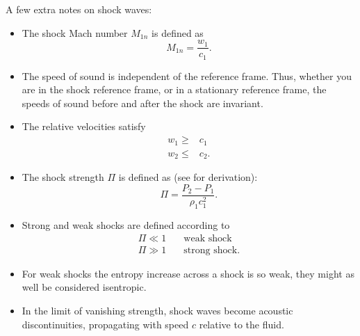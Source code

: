 \documentclass[oneside,a4paper,11pt]{report}
\begin{document}
A few extra notes on shock waves:
\begin{itemize}
    \item The shock Mach number $M_{1n}$ is defined as
    \begin{equation}
        M_{1n} = \frac{w_1}{c_1}.
    \end{equation}
    
    \item The speed of sound is independent of the reference frame. Thus, whether you are in the shock reference frame, or in a stationary reference frame, the speeds of sound before and after the shock are invariant.
    
    \item The relative velocities satisfy
    \begin{align}
        w_1 \ge &c_1 \nonumber \\
        w_2 \le &c_2.
    \end{align}
    
    \item The shock strength $\Pi$ is defined as (see \cite{thompson1988} for derivation):
    \begin{equation}
    \label{eq:shock_strength}
        \Pi = \frac{P_2 - P_1}{\rho_1 c_1^2}.
    \end{equation}
    
    \item Strong and weak shocks are defined according to
    \begin{align}
    \label{eq:strong_weak_shocks}
        \Pi \ll 1 \quad & \text{weak shock} \nonumber \\
        \Pi \gg 1 \quad & \text{strong shock}.
    \end{align}
    
    \item For weak shocks the entropy increase across a shock is so weak, they might as well be considered isentropic.
    
    \item In the limit of vanishing strength, shock waves become acoustic discontinuities, propagating with speed $c$ relative to the fluid.
\end{itemize}

\end{document}
